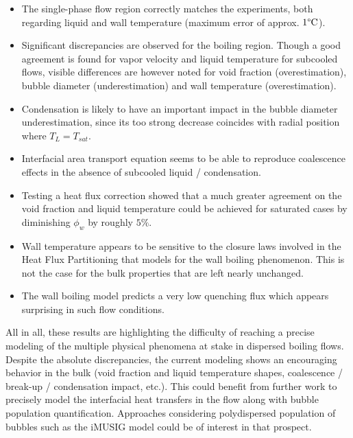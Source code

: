 \begin{itemize}
\item The single-phase flow region correctly matches the experiments, both regarding liquid and wall temperature (maximum error of approx. $1\degree\mathrm{C}$).

\item Significant discrepancies are observed for the boiling region. Though a good agreement is found for vapor velocity and liquid temperature for subcooled flows, visible differences are however noted for void fraction (overestimation), bubble diameter (underestimation) and wall temperature (overestimation). 

\item Condensation is likely to have an important impact in the bubble diameter underestimation, since its too strong decrease coincides with radial position where $T_{L}=T_{sat}$. 

\item Interfacial area transport equation seems to be able to reproduce coalescence effects in the absence of subcooled liquid / condensation.


\item Testing a heat flux correction showed that a much greater agreement on the void fraction and liquid temperature could be achieved for saturated cases by diminishing $\phi_{w}$ by roughly $5\%$.

\item Wall temperature appears to be sensitive to the closure laws involved in the Heat Flux Partitioning that models for the wall boiling phenomenon. This is not the case for the bulk properties that are left nearly unchanged.

\item The wall boiling model predicts a very low quenching flux which appears surprising in such flow conditions. 


\end{itemize} 

All in all, these results are highlighting the difficulty of reaching a precise modeling of the multiple physical phenomena at stake in dispersed boiling flows. Despite the absolute discrepancies, the current modeling shows an encouraging behavior in the bulk (void fraction and liquid temperature shapes, coalescence / break-up / condensation impact, etc.). This could benefit from further work to precisely model the interfacial heat transfers in the flow along with bubble population quantification. Approaches considering polydispersed population of bubbles such as the iMUSIG model \cite{krepper_inhomogeneous_2008} could be of interest in that prospect.

